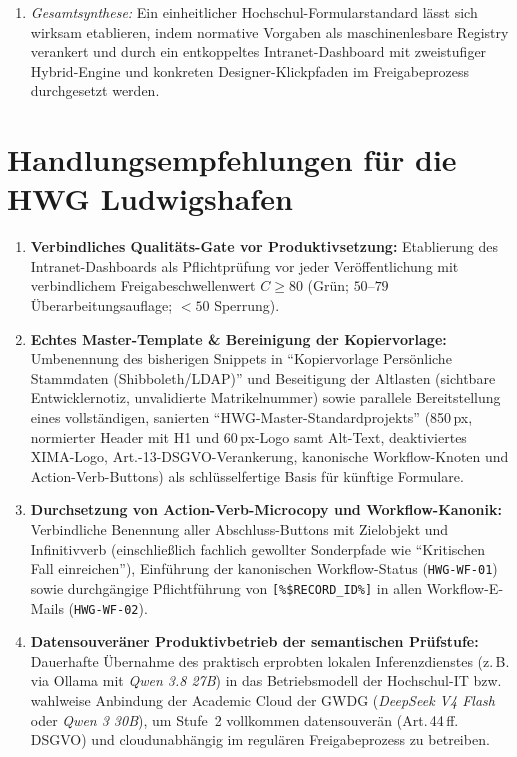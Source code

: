 \begin{enumerate}
    \item[\textbf{MRQ:}] \textit{Gesamtsynthese:} Ein einheitlicher Hochschul-Formularstandard lässt sich wirksam etablieren, indem normative Vorgaben als maschinenlesbare Registry verankert und durch ein entkoppeltes Intranet-Dashboard mit zweistufiger Hybrid-Engine und konkreten Designer-Klickpfaden im Freigabeprozess durchgesetzt werden.
\end{enumerate}

\section{Handlungsempfehlungen für die HWG Ludwigshafen}
\label{sec:handlungsempfehlungen}

\begin{enumerate}
    \item \textbf{Verbindliches Qualitäts-Gate vor Produktivsetzung:} Etablierung des Intranet-Dashboards als Pflichtprüfung vor jeder Veröffentlichung mit verbindlichem Freigabeschwellenwert $C \ge 80$ (Grün; $50\text{--}79$ Überarbeitungsauflage; $<50$ Sperrung).
    \item \textbf{Echtes Master-Template \& Bereinigung der Kopiervorlage:} Umbenennung des bisherigen Snippets in \enquote{Kopiervorlage Persönliche Stammdaten (Shibboleth/LDAP)} und Beseitigung der Altlasten (sichtbare Entwicklernotiz, unvalidierte Matrikelnummer) sowie parallele Bereitstellung eines vollständigen, sanierten \enquote{HWG-Master-Standardprojekts} (850\,px, normierter Header mit H1 und 60\,px-Logo samt Alt-Text, deaktiviertes XIMA-Logo, Art.-13-DSGVO-Verankerung, kanonische Workflow-Knoten und Action-Verb-Buttons) als schlüsselfertige Basis für künftige Formulare.
    \item \textbf{Durchsetzung von Action-Verb-Microcopy und Workflow-Kanonik:} Verbindliche Benennung aller Abschluss-Buttons mit Zielobjekt und Infinitivverb (einschließlich fachlich gewollter Sonderpfade wie \enquote{Kritischen Fall einreichen}), Einführung der kanonischen Workflow-Status (\texttt{HWG-WF-01}) sowie durchgängige Pflichtführung von \texttt{[\%\$RECORD\_ID\%]} in allen Workflow-E-Mails (\texttt{HWG-WF-02}).
    \item \textbf{Datensouveräner Produktivbetrieb der semantischen Prüfstufe:} Dauerhafte Übernahme des praktisch erprobten lokalen Inferenzdienstes (z.\,B. via Ollama mit \textit{Qwen 3.8 27B}) in das Betriebsmodell der Hochschul-IT bzw. wahlweise Anbindung der Academic Cloud der GWDG (\textit{DeepSeek V4 Flash} oder \textit{Qwen 3 30B}), um Stufe~2 vollkommen datensouverän (Art.\,44\,ff. DSGVO) und cloudunabhängig im regulären Freigabeprozess zu betreiben.
\end{enumerate}

